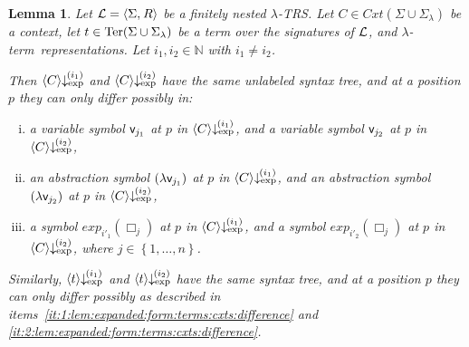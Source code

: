 \documentclass[
submission
]{dmtcs-episciences-tampered}
\newcommand{\fap}[2]{#1({#2})}
\newcommand{\iap}[2]{#1 _{#2}}
\newcommand{\indap}[2]{#1 _{#2}}
\newcommand{\bpap}[3]{#1 _{#2}^{#3}}
\newcommand{\nb}{\nobreakdash}
\newcommand{\nf}{\normalfont}
\newcommand{\tuple}[1]{\langle #1 \rangle}
\newcommand{\tuplespace}{\hspace*{0.5pt}}
\newcommand{\pair}[2]{\tuple{#1, \tuplespace #2}}
\newcommand{\setexp}[1]{\left\{{#1}\right\}}
\newcommand{\nat}{\mathbb{N}}
\newcommand{\bter}{t}
\newcommand{\asig}{\Sigma}
\newcommand{\asiglambda}{\indap{\asig}{\lambda}}
\newcommand{\arules}{R}
\newcommand{\alTRS}{{\cal L}}
\newcommand{\TRS}{TRS}
\newcommand{\stermsover}{\text{\nf Ter}}
\newcommand{\termsover}{\fap{\stermsover}}
\newcommand{\scontextsover}{\textit{Cxt}}
\newcommand{\contextsover}{\fap{\scontextsover}}
\newcommand{\sfolabs}[1]{(\lambda{#1})}
\newcommand{\afovar}{\mathsf{v}}
\newcommand{\afovari}[1]{\indap{\afovar}{\hspace*{-0.25pt}#1}}
\newcommand{\acxt}{C}
\newcommand{\hole}{\Box}
\newcommand{\holei}{\iap{\hole}}
\newcommand{\scriptexp}{\text{\nf exp}}
\newcommand{\sexpand}{\textit{exp}}
\newcommand{\sexpandi}{\indap{\sexpand}}
\newcommand{\expandi}[1]{\fap{\sexpandi{#1}}}
\newcommand{\sexprednfi}[1]{{\bpap{\downarrow}{\scriptexp}{\hspace*{-1pt}(#1)}}}
\newcommand{\exprednfi}[2]{{\langle#2\rangle}\sexprednfi{#1}}
\newcommand{\lambdaterm}{$\lambda$\nb-term}
\newcommand{\lTRS}{$\lambda$\hspace*{-0.5pt}\nb-\hspace*{-0.5pt}\TRS}
\theoremstyle{plain}
\newtheorem{lemma}[theorem]{Lemma}
\theoremstyle{definition}
\begin{document}
\begin{lemma}\label{lem:expanded:form:terms:cxts:difference}
  Let $\alTRS = \pair{\asig}{\arules}$ be a finitely nested \lTRS.
Let $\acxt\in\contextsover{\asig\cup\asiglambda}$ be a context, let $\bter\in\termsover{\asig\cup\asiglambda}$ be a term
  over the signatures of $\alTRS$, and \lambdaterm\ representations.
  Let $i_1,i_2\in\nat$ with $i_1 \neq i_2$.  
  
  Then $\exprednfi{i_1}{\acxt}$ and $\exprednfi{i_2}{\acxt}$ have the same unlabeled syntax tree,
  and at a position $p$ they can only differ possibly in:
  \begin{enumerate}[(i)]\setlength{\itemsep}{0ex}
    \item{}\label{it:1:lem:expanded:form:terms:cxts:difference}
      a variable symbol $\afovari{j_1}$ at $p$ in $\exprednfi{i_1}{\acxt}$, and a variable symbol $\afovari{j_2}$ at $p$ in $\exprednfi{i_2}{\acxt}$,
    \item{}\label{it:2:lem:expanded:form:terms:cxts:difference}   
      an abstraction symbol $\sfolabs{\afovari{j_1}}$ at $p$ in $\exprednfi{i_1}{\acxt}$, and an abstraction symbol $\sfolabs{\afovari{j_2}}$ at $p$ in $\exprednfi{i_2}{\acxt}$,
    \item{}\label{it:3:lem:expanded:form:terms:cxts:difference}
      a symbol $\expandi{i'_1}{\holei{j}}$ at $p$ in $\exprednfi{i_1}{\acxt}$, and a symbol $\expandi{i'_2}{\holei{j}}$ at $p$ in $\exprednfi{i_2}{\acxt}$,
      where $j\in\setexp{1,\ldots,n}$.
  \end{enumerate} 
  Similarly,  $\exprednfi{i_1}{\bter}$ and $\exprednfi{i_2}{\bter}$ have the same syntax tree,
  and at a position $p$ they can only differ possibly as described 
  in items~\eqref{it:1:lem:expanded:form:terms:cxts:difference} and \eqref{it:2:lem:expanded:form:terms:cxts:difference}.
\end{lemma}
\end{document}

